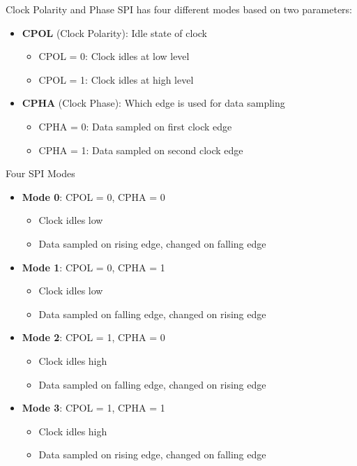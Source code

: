 \begin{concept}{Clock Polarity and Phase}
SPI has four different modes based on two parameters:
\begin{itemize}
    \item \textbf{CPOL} (Clock Polarity): Idle state of clock
    \begin{itemize}
        \item CPOL = 0: Clock idles at low level
        \item CPOL = 1: Clock idles at high level
    \end{itemize}
    \item \textbf{CPHA} (Clock Phase): Which edge is used for data sampling
    \begin{itemize}
        \item CPHA = 0: Data sampled on first clock edge
        \item CPHA = 1: Data sampled on second clock edge
    \end{itemize}
\end{itemize}
\end{concept}

\begin{concept}{Four SPI Modes}
\begin{itemize}
    \item \textbf{Mode 0}: CPOL = 0, CPHA = 0
    \begin{itemize}
        \item Clock idles low
        \item Data sampled on rising edge, changed on falling edge
    \end{itemize}
    \item \textbf{Mode 1}: CPOL = 0, CPHA = 1
    \begin{itemize}
        \item Clock idles low
        \item Data sampled on falling edge, changed on rising edge
    \end{itemize}
    \item \textbf{Mode 2}: CPOL = 1, CPHA = 0
    \begin{itemize}
        \item Clock idles high
        \item Data sampled on falling edge, changed on rising edge
    \end{itemize}
    \item \textbf{Mode 3}: CPOL = 1, CPHA = 1
    \begin{itemize}
        \item Clock idles high
        \item Data sampled on rising edge, changed on falling edge
    \end{itemize}
\end{itemize}
\end{concept}


